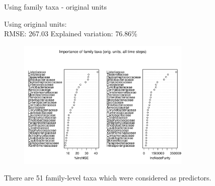 \documentclass{beamer}
\begin{document}
\begin{frame}{Using family taxa - original units}

  {\scriptsize
    
  \noindent Using original units:\\
  RMSE: 267.03  \hspace{0.05in}  Explained variation: 76.86\%

  \begin{center}
    \begin{figure}
      \includegraphics[width=3.25in]{../only_families/all_time_steps/orig_units_all_data_families_imp_plot}
    \end{figure}
  \end{center}
  \vspace{-0.25in}

\noindent There are 51 family-level taxa which were considered as predictors.
}

\end{frame}
\end{document}
